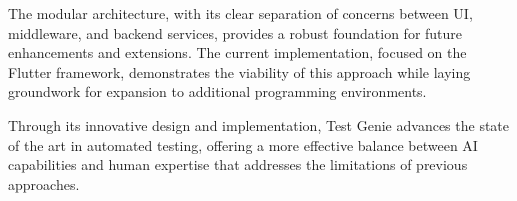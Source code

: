 \hspace{0.5cm}The modular architecture, with its clear separation of concerns between UI, middleware, and backend services, provides a robust foundation for future enhancements and extensions. The current implementation, focused on the Flutter framework, demonstrates the viability of this approach while laying groundwork for expansion to additional programming environments.

\hspace{0.5cm}Through its innovative design and implementation, Test Genie advances the state of the art in automated testing, offering a more effective balance between AI capabilities and human expertise that addresses the limitations of previous approaches.